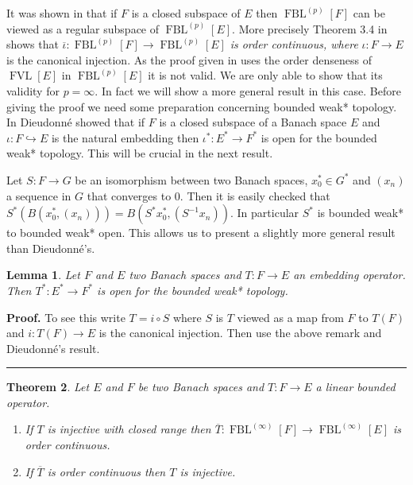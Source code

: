 \documentclass[12pt]{article}%
\newtheorem{theorem}{Theorem}
\newtheorem{lemma}[theorem]{Lemma}
\newenvironment{proof}[1][Proof]{\noindent\textbf{#1.} }{\ \rule{0.5em}{0.5em}}
\begin{document}
It was shown in \cite{L-925} that if $F$ is a closed subspace of $E$ then
$\operatorname*{FBL}\nolimits^{(p)}\left[  F\right]  $ can be viewed as a
regular subspace of $\operatorname*{FBL}\nolimits^{(p)}\left[  E\right]  .$
More precisely Theorem 3.4 in \cite{L-925} shows that $\overline{\iota
}:\operatorname*{FBL}\nolimits^{(p)}[F]\rightarrow\operatorname*{FBL}%
\nolimits^{(p)}[E]$ \textit{is order continuous, where }$\iota
:F\longrightarrow E$ is the canonical injection. As the proof given in
\cite{L-925} uses the order denseness of $\operatorname*{FVL}\left[  E\right]
$ in $\operatorname*{FBL}\nolimits^{(p)}\left[  E\right]  $ it is not valid.
We are only able to show that its validity for $p=\infty$. In fact we will
show a more general result in this case. Before giving the proof we need some
preparation concerning bounded weak* topology. In \cite[Theorem 2]{a-2643}
Dieudonn\'{e} showed that if $F$ is a closed subspace of a Banach space $E$
and $\iota:F\hookrightarrow E$ is the natural embedding then $\iota^{\ast
}:E^{\ast}\longrightarrow F^{\ast}$ is open for the bounded weak* topology.
This will be crucial in the next result.

Let $S:F\longrightarrow G$ be an isomorphism between two Banach spaces,
$x_{0}^{\ast}\in G^{\ast}$ and $\left(  x_{n}\right)  $ a sequence in $G$ that
converges to $0.$ Then it is easily checked that $S^{\ast}\left(  B\left(
x_{0}^{\ast},\left(  x_{n}\right)  \right)  \right)  =B\left(  S^{\ast}%
x_{0}^{\ast},\left(  S^{-1}x_{n}\right)  \right)  .$ In particular $S^{\ast}$
is bounded weak* to bounded weak* open. This allows us to present a slightly
more general result than Dieudonn\'{e}'s.

\begin{lemma}
\label{DI}Let $F$ and $E$ two Banach spaces and $T:F\longrightarrow E$ an
embedding operator. Then $T^{\ast}:E^{\ast}\longrightarrow F^{\ast}$ is open
for the bounded weak* topology.
\end{lemma}

\begin{proof}
To see this write $T=i\circ S$ where $S$ is $T$ viewed as a map from $F$ to
$T\left(  F\right)  $ and $i:T\left(  F\right)  \longrightarrow E$ is the
canonical injection. Then use the above remark and Dieudonn\'{e}'s result.
\end{proof}

\begin{theorem}
Let $E$ and $F$ be two Banach spaces and $T:F\longrightarrow E$ a linear
bounded operator.

\begin{enumerate}
\item If $T$ is injective with closed range then $\overline{T}%
:\operatorname*{FBL}\nolimits^{(\infty)}[F]\rightarrow\operatorname*{FBL}%
\nolimits^{(\infty)}[E]$ \textit{is order continuous.}

\item If $\overline{T}$ is order continuous then $T$ is injective.
\end{enumerate}
\end{theorem}
\end{document}
